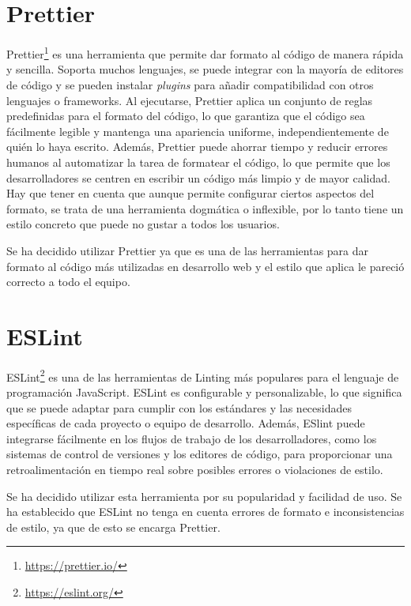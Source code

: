 \section{Prettier}\label{sec:prettier}
Prettier\footnote{\url{https://prettier.io/}} es una herramienta que permite dar formato al código de manera rápida y sencilla. Soporta muchos lenguajes, se puede integrar con la mayoría de editores de código y se pueden instalar \textit{plugins} para añadir compatibilidad con otros lenguajes o frameworks. Al ejecutarse, Prettier aplica un conjunto de reglas predefinidas para el formato del código, lo que garantiza que el código sea fácilmente legible y mantenga una apariencia uniforme, independientemente de quién lo haya escrito. Además, Prettier puede ahorrar tiempo y reducir errores humanos al automatizar la tarea de formatear el código, lo que permite que los desarrolladores se centren en escribir un código más limpio y de mayor calidad. Hay que tener en cuenta que aunque permite configurar ciertos aspectos del formato, se trata de una herramienta dogmática o inflexible, por lo tanto tiene un estilo concreto que puede no gustar a todos los usuarios.

Se ha decidido utilizar Prettier ya que es una de las herramientas para dar formato al código más utilizadas en desarrollo web y el estilo que aplica le pareció correcto a todo el equipo.

\section{ESLint}\label{sec:eslint}
ESLint\footnote{\url{https://eslint.org/}} es una de las herramientas de Linting más populares para el lenguaje de programación JavaScript. ESLint es configurable y personalizable, lo que significa que se puede adaptar para cumplir con los estándares y las necesidades específicas de cada proyecto o equipo de desarrollo. Además, ESlint puede integrarse fácilmente en los flujos de trabajo de los desarrolladores, como los sistemas de control de versiones y los editores de código, para proporcionar una retroalimentación en tiempo real sobre posibles errores o violaciones de estilo.

Se ha decidido utilizar esta herramienta por su popularidad y facilidad de uso. Se ha establecido que ESLint no tenga en cuenta errores de formato e inconsistencias de estilo, ya que de esto se encarga Prettier.